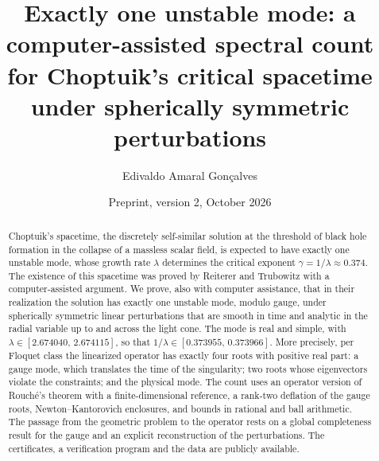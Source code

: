 \documentclass[11pt]{amsart}
\title[One unstable mode for Choptuik's spacetime]{Exactly one unstable mode: a computer-assisted spectral
count for Choptuik's critical spacetime under spherically symmetric perturbations}
\author{Edivaldo Amaral Gon\c{c}alves}
\date{Preprint, version 2, October 2026}
\begin{document}
\begin{abstract}
Choptuik's spacetime, the discretely self-similar solution at the threshold of black hole formation in the
collapse of a massless scalar field, is expected to have exactly one unstable mode, whose growth rate $\lambda$
determines the critical exponent $\gamma=1/\lambda\approx0.374$. The existence of this spacetime was proved by
Reiterer and Trubowitz with a computer-assisted argument. We prove, also with computer assistance, that in their
realization the solution has exactly one unstable mode, modulo gauge, under spherically symmetric linear
perturbations that are smooth in time and analytic in the radial variable up to and across the light cone. The
mode is real and simple, with $\lambda\in[2.674040,\,2.674115]$, so that
$1/\lambda\in[0.373955,\,0.373966]$. More precisely, per Floquet class the linearized operator has exactly four
roots with positive real part: a gauge mode, which translates the time of the singularity; two roots whose
eigenvectors violate the constraints; and the physical mode. The count uses an operator version of Rouch\'e's
theorem with a finite-dimensional reference, a rank-two deflation of the gauge roots, Newton--Kantorovich
enclosures, and bounds in rational and ball arithmetic. The passage from the geometric problem to the operator
rests on a global completeness result for the gauge and an explicit reconstruction of the perturbations. The
certificates, a verification program and the data are publicly available.
\end{abstract}

\maketitle
\setcounter{tocdepth}{1}
\tableofcontents












\appendix
{}%






\end{document}
